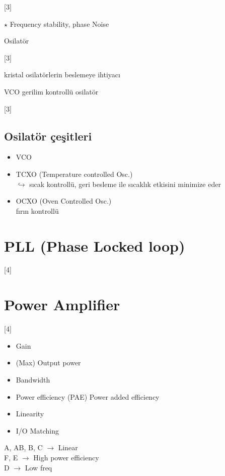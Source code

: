 \documentclass[11pt,a4paper]{article}
\begin{document}
[3]

$\star$ Frequency stability, phase Noise

Osilatör

[3]

kristal osilatörlerin beslemeye ihtiyacı 

VCO gerilim kontrollü osilatör

[3]

\subsection{Osilatör çeşitleri}
\begin{itemize}[label=$\rightarrow$,leftmargin=2em]
\item VCO
\item TCXO (Temperature controlled Osc.) \\ $\hookrightarrow$ sıcak kontrollü, geri besleme ile sıcaklık etkisini minimize eder
\item OCXO (Oven Controlled Osc.) \\ fırın kontrollü
\end{itemize}

\section{PLL (Phase Locked loop)}
[4]

\section{Power Amplifier}
[4]

\begin{itemize}[label={},leftmargin=1em]
\item Gain
\item (Max) Output power
\item Bandwidth
\item Power efficiency \quad (PAE) \quad Power added efficiency
\item Linearity
\item I/O Matching
\end{itemize}

A, AB, B, C $\rightarrow$ Linear \\
F, E $\rightarrow$ High power efficiency \\
D $\rightarrow$ Low freq
\end{document}
